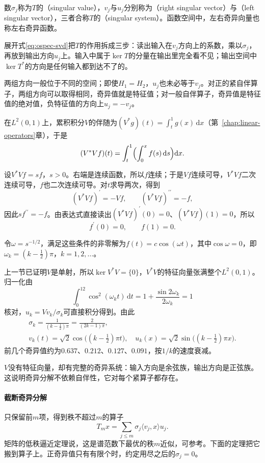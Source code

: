 数$\sigma_j$称为$T$的（singular value），$v_j$与$u_j$分别称为（right singular vector）与（left singular vector），三者合称$T$的（singular system）。函数空间中，左右奇异向量也称左右奇异函数。

展开式\eqref{eq:ospec-svd}把$T$的作用拆成三步：读出输入在$v_j$方向上的系数，乘以$\sigma_j$，再放到输出方向$u_j$上。输入中属于$\ker T$的分量在输出里完全看不见；输出空间中$\ker T^*$的方向是任何输入都到达不了的。

两组方向一般位于不同的空间；即使$H_1=H_2$，$u_j$也未必等于$v_j$。对正的紧自伴算子，两组方向可以取得相同，奇异值就是特征值；对一般自伴算子，奇异值是特征值的绝对值，负特征值的方向上$u_j=-v_j$。

\begin{example}[累积积分的奇异分解]
\label{ex:ospec-volterra-svd}
在$L^2(0,1)$上，累积积分$V$的伴随为$(V^*g)(t)=\int_t^1g(x)\,\mathrm dx$（第~\ref{chap:linear-operators}章），于是
\[
(V^*Vf)(t)=\int_t^1\Bigl(\int_0^xf(s)\,\mathrm ds\Bigr)\mathrm dx .
\]

设$V^*Vf=sf$，$s>0$。右端是连续函数，所以$f$连续；于是$Vf$连续可导，$V^*Vf$二次连续可导，$f$也二次连续可导。对$t$求导两次，得到
\[
(V^*Vf)^\prime=-Vf,\qquad(V^*Vf)^{\prime\prime}=-f,
\]
因此$sf^{\prime\prime}=-f$。由表达式直接读出$(V^*Vf)^\prime(0)=0$、$(V^*Vf)(1)=0$，所以
\[
f^\prime(0)=0,\qquad f(1)=0.
\]

令$\omega=s^{-1/2}$，满足这些条件的非零解为$f(t)=c\cos(\omega t)$，其中$\cos\omega=0$，即$\omega_k=(k-\frac12)\pi$，$k=1,2,\ldots$。

上一节已证明$V$是单射，所以$\ker V^*V=\{0\}$，$V^*V$的特征向量张满整个$L^2(0,1)$。归一化由
\[
\int_0^12\cos^2(\omega_kt)\,\mathrm dt=1+\frac{\sin2\omega_k}{2\omega_k}=1
\]
核对，$u_k=Vv_k/\sigma_k$可直接积分得到。由此
\[
\begin{gathered}
\sigma_k=\frac{1}{(k-\frac12)\pi}=\frac{2}{(2k-1)\pi},\\
v_k(t)=\sqrt2\cos\bigl((k-\tfrac12)\pi t\bigr),\quad u_k(x)=\sqrt2\sin\bigl((k-\tfrac12)\pi x\bigr).
\end{gathered}
\]
前几个奇异值约为$0.637$、$0.212$、$0.127$、$0.091$，按$1/k$的速度衰减。
\end{example}

$V$没有特征向量，却有完整的奇异系统：输入方向是余弦族，输出方向是正弦族。这说明奇异分解不依赖自伴性，它对每个紧算子都存在。

\paragraph{截断奇异分解}
只保留前$m$项，得到秩不超过$m$的算子
\[
T_mx=\sum_{j\leq m}\sigma_j\langle v_j,x\rangle u_j .
\]
矩阵的低秩逼近定理说，这是谱范数下最优的秩$m$近似，可参考。下面的定理把它搬到算子上。正奇异值只有有限个时，约定用尽之后的$\sigma_j=0$。

